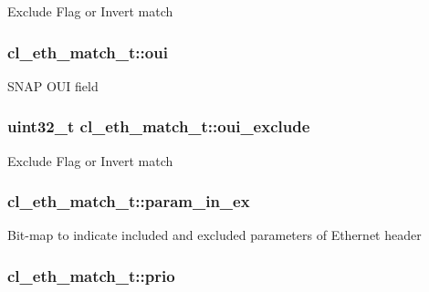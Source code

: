 Exclude Flag or Invert match \hypertarget{structcl__eth__match__t_a78e975708b3e168c80094896dc2fb022}{
\subsubsection[{oui}]{ cl\-\_\-eth\-\_\-match\-\_\-t\-::oui}}\label{structcl__eth__match__t_a78e975708b3e168c80094896dc2fb022}
S\-N\-A\-P O\-U\-I field \hypertarget{structcl__eth__match__t_adf4f05c03331311fd8b093be5b42eb6a}{
\subsubsection[{oui\-\_\-exclude}]{\setlength{\rightskip}{0pt plus 5cm}uint32\-\_\-t cl\-\_\-eth\-\_\-match\-\_\-t\-::oui\-\_\-exclude}}\label{structcl__eth__match__t_adf4f05c03331311fd8b093be5b42eb6a}
Exclude Flag or Invert match \hypertarget{structcl__eth__match__t_a288c8e7ff8257e915cca4b3de17b4c9d}{
\subsubsection[{param\-\_\-in\-\_\-ex}]{ cl\-\_\-eth\-\_\-match\-\_\-t\-::param\-\_\-in\-\_\-ex}}\label{structcl__eth__match__t_a288c8e7ff8257e915cca4b3de17b4c9d}
Bit-\/map to indicate included and excluded parameters of Ethernet header \hypertarget{structcl__eth__match__t_a96a22755831c1d3251676ee7063e1c07}{
\subsubsection[{prio}]{ cl\-\_\-eth\-\_\-match\-\_\-t\-::prio}}\label{structcl__eth__match__t_a96a22755831c1d3251676ee7063e1c07}
